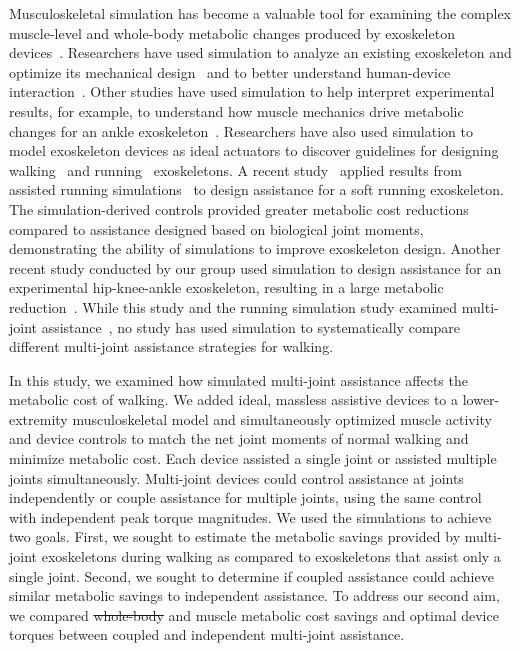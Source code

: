 \documentclass[10pt,letterpaper]{article}
\providecommand{\DIFaddtex}[1]{{\protect\color{blue}{#1}}} %
\providecommand{\DIFdeltex}[1]{{\protect\color{red}\sout{#1}}}                      %
\providecommand{\DIFaddbegin}{} %
\providecommand{\DIFaddend}{} %
\providecommand{\DIFdelbegin}{} %
\providecommand{\DIFdelend}{} %
\providecommand{\DIFadd}[1]{\texorpdfstring{\DIFaddtex{#1}}{#1}} %
\providecommand{\DIFdel}[1]{\texorpdfstring{\DIFdeltex{#1}}{}} %
\newcommand{\DIFscaledelfig}{0.5}
\newlength{\DIFdelgraphicswidth} %
\newlength{\DIFdelgraphicsheight} %
\newcommand{\DIFaddincludegraphics}[2][]{{\color{blue}\fbox{\DIFOincludegraphics[#1]{#2}}}} %
\newcommand{\DIFdelincludegraphics}[2][]{%
\sbox{\DIFdelgraphicsbox}{\DIFOincludegraphics[#1]{#2}}%
\settoboxwidth{\DIFdelgraphicswidth}{\DIFdelgraphicsbox} %
\settoboxtotalheight{\DIFdelgraphicsheight}{\DIFdelgraphicsbox} %
\scalebox{\DIFscaledelfig}{%
\parbox[b]{\DIFdelgraphicswidth}{\usebox{\DIFdelgraphicsbox}\\[-\baselineskip] \rule{\DIFdelgraphicswidth}{0em}}\llap{\resizebox{\DIFdelgraphicswidth}{\DIFdelgraphicsheight}{%
\setlength{\unitlength}{\DIFdelgraphicswidth}%
\begin{picture}(1,1)%
\thicklines\linethickness{2pt} %
{\color[rgb]{1,0,0}\put(0,0){\framebox(1,1){}}}%
{\color[rgb]{1,0,0}\put(0,0){\line( 1,1){1}}}%
{\color[rgb]{1,0,0}\put(0,1){\line(1,-1){1}}}%
\end{picture}%
}*{3pt}}} %
} %
\DeclareRobustCommand{\DIFaddbegin}{\DIFOaddbegin \let\includegraphics\DIFaddincludegraphics} %
\DeclareRobustCommand{\DIFaddend}{\DIFOaddend \let\includegraphics\DIFOincludegraphics} %
\DeclareRobustCommand{\DIFdelbegin}{\DIFOdelbegin \let\includegraphics\DIFdelincludegraphics} %
\DeclareRobustCommand{\DIFdelend}{\DIFOaddend \let\includegraphics\DIFOincludegraphics} %
\begin{document}
Musculoskeletal simulation has become a valuable tool for examining the complex muscle-level and whole-body metabolic changes produced by exoskeleton devices~\cite{Grabke:2019}. Researchers have used simulation to analyze an existing exoskeleton and optimize its mechanical design~\cite{Manns:2017} and to better understand human-device interaction~\cite{Fournier:2018}. Other studies have used simulation to help interpret experimental results, for example, to understand how muscle mechanics drive metabolic changes for an ankle exoskeleton~\cite{Jackson:2017}. Researchers have also used simulation to model exoskeleton devices as ideal actuators to discover guidelines for designing walking~\cite{Dembia:2017} and running~\cite{Uchida:2016} exoskeletons. A recent study~\cite{Lee:2017} applied results from assisted running simulations~\cite{Uchida:2016} to design assistance for a soft running exoskeleton. The simulation-derived controls provided greater metabolic cost reductions compared to assistance designed based on biological joint moments, demonstrating the ability of simulations to improve exoskeleton design. Another recent study conducted by our group used simulation to design assistance for an experimental hip-knee-ankle exoskeleton, resulting in a large metabolic reduction~\cite{Franks:2020}. While this study and the running simulation study examined multi-joint assistance~\cite{Uchida:2016}, no study has used simulation to systematically compare different multi-joint assistance strategies for walking.

In this study, we examined how simulated multi-joint assistance affects the metabolic cost of walking. We added ideal, massless assistive devices to a lower-extremity musculoskeletal model and simultaneously optimized muscle activity and device controls to match the net joint moments of normal walking and minimize metabolic cost. Each device assisted a single joint or assisted multiple joints simultaneously. Multi-joint devices could control assistance at joints independently or couple assistance for multiple joints, using the same control with independent peak torque magnitudes. We used the simulations to achieve two goals. First, we sought to estimate the metabolic savings provided by multi-joint exoskeletons during walking as compared to exoskeletons that assist only a single joint. Second, we sought to determine if coupled assistance could achieve similar metabolic savings \DIFaddbegin \DIFadd{compared }\DIFaddend to independent assistance. To address our second aim, we compared \DIFdelbegin \DIFdel{whole-body }\DIFdelend \DIFaddbegin \DIFadd{total }\DIFaddend and muscle metabolic cost savings and optimal device torques between coupled and independent multi-joint assistance.
\end{document}
